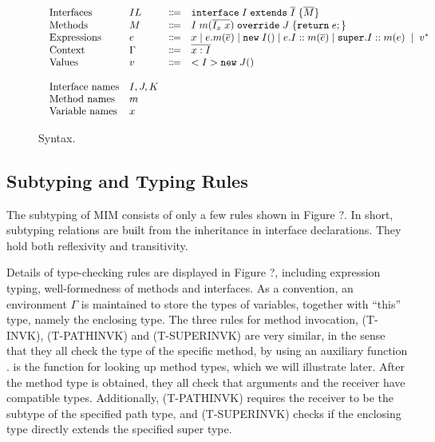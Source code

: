 \begin{figure*}[htbp]
\begin{displaymath}
\begin{array}{l}
\begin{array}{llrl}
\text{Interfaces}   & IL & \Coloneqq & \texttt{interface} \; I \; \texttt{extends} \; \overline{I} \; {\{} \overline{M} {\}} \\
\text{Methods}      & M  & \Coloneqq & I \; m (\overline{I_x \; x}) \; \texttt{override} \; J \; {\{} \texttt{return} \; e ; {\}} \\
\text{Expressions}  & e  & \Coloneqq & x \mid
e.m(\overline{e}) \mid
\texttt{new} \; I() \mid
e.I::m(\overline{e}) \mid
\texttt{super}.I::m(e) \; \mid \; v^* \\
\text{Context}      & \Gamma & \Coloneqq & \overline{x:I} \\
\text{Values}       & v & \Coloneqq & <I>\texttt{new} \; J() \\
\\
\text{Interface names} & I, J, K & & \\
\text{Method names} & m & & \\
\text{Variable names} & x & &
\end{array}
\end{array}
\end{displaymath}
\caption{Syntax. }\label{fig:syntax}
\end{figure*}

\subsection{Subtyping and Typing Rules}
The subtyping of MIM consists of only a few rules shown in Figure ?.
In short, subtyping relations are built from the inheritance in interface
declarations. They hold both reflexivity and transitivity.

Details of type-checking rules are displayed in Figure ?, including expression
typing, well-formedness of methods and interfaces. As a convention, an environment
$\Gamma$ is maintained to store the types of variables, together with ``this'' type, namely
the enclosing type. The three rules for method invocation, (T-INVK), (T-PATHINVK) and (T-SUPERINVK)
are very similar, in the sense that they all check the type of the specific method, by using
an auxiliary function \mtype. \mtype is the function for looking up method types, which we will
illustrate later. After the method type is obtained, they all check that arguments and the receiver
have compatible types. Additionally, (T-PATHINVK) requires the receiver to be the subtype of the specified
path type, and (T-SUPERINVK) checks if the enclosing type directly extends the specified super type.

